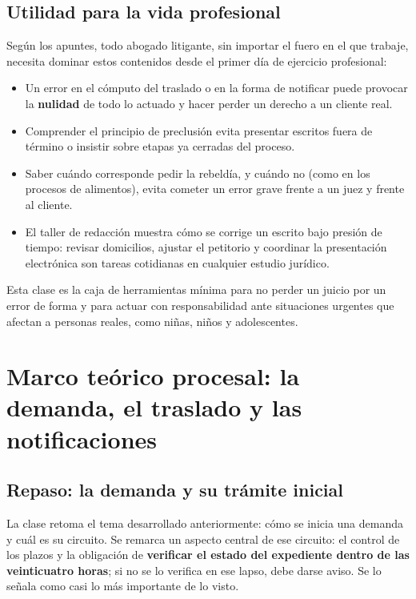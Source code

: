 \documentclass[12pt,oneside]{book}
\begin{document}
\section{Utilidad para la vida profesional}

Seg\'un los apuntes, todo abogado litigante, sin importar el fuero en el que trabaje, necesita dominar estos contenidos desde el primer d\'ia de ejercicio profesional:
\begin{itemize}
    \item Un error en el c\'omputo del traslado o en la forma de notificar puede provocar la \textbf{nulidad} de todo lo actuado y hacer perder un derecho a un cliente real.
    \item Comprender el principio de preclusi\'on evita presentar escritos fuera de t\'ermino o insistir sobre etapas ya cerradas del proceso.
    \item Saber cu\'ando corresponde pedir la rebeld\'ia, y cu\'ando no (como en los procesos de alimentos), evita cometer un error grave frente a un juez y frente al cliente.
    \item El taller de redacci\'on muestra c\'omo se corrige un escrito bajo presi\'on de tiempo: revisar domicilios, ajustar el petitorio y coordinar la presentaci\'on electr\'onica son tareas cotidianas en cualquier estudio jur\'idico.
\end{itemize}

\begin{important}
Esta clase es la caja de herramientas m\'inima para no perder un juicio por un error de forma y para actuar con responsabilidad ante situaciones urgentes que afectan a personas reales, como ni\~nas, ni\~nos y adolescentes.
\end{important}

\chapter{Marco te\'orico procesal: la demanda, el traslado y las notificaciones}

\section{Repaso: la demanda y su tr\'amite inicial}

La clase retoma el tema desarrollado anteriormente: c\'omo se inicia una demanda y cu\'al es su circuito. Se remarca un aspecto central de ese circuito: el control de los plazos y la obligaci\'on de \textbf{verificar el estado del expediente dentro de las veinticuatro horas}; si no se lo verifica en ese lapso, debe darse aviso. Se lo se\~nala como casi lo m\'as importante de lo visto.
\end{document}
